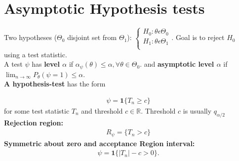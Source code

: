 \section{Asymptotic Hypothesis tests}

Two hypotheses ($\Theta_0$ disjoint set from $\Theta_1$):
$\begin{cases}
		H_0: \theta \epsilon \Theta_0\\
		H_1: \theta \epsilon \Theta_1\\
\end{cases}$. Goal is to reject $H_0$ using a test statistic.\\

A test $\psi$ has \textbf{level $\alpha$} if $\alpha_{\psi}(\theta) \leq \alpha, \forall \theta \in \Theta_0.$ and \textbf{asymptotic level $\alpha$} if $\lim _{n \to \infty } P_\theta ( \psi = 1) \leq \alpha$.\\

\textbf{A hypothesis-test} has the form 

\begin{align*}
\psi = \textbf{1} \lbrace  T_n \geq c \rbrace
\end{align*}
for some test statistic $T_n$ and threshold $c \in \mathbb{R}$. Threshold $c$ is usually $q_{\alpha/2}$\\
\textbf{Rejection region:}
\begin{align*}
R_{\psi} = \lbrace T_n > c \rbrace
\end{align*}
\textbf{Symmetric about zero and acceptance Region interval:}
\begin{align*}
\psi = \mathbf{1}\{  |T_n| - c > 0 \} .
\end{align*}

